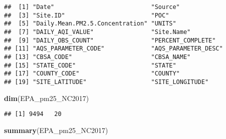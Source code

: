 \documentclass[]{article}
\newenvironment{Shaded}{\begin{snugshade}}{\end{snugshade}}
\newcommand{\KeywordTok}[1]{\textcolor[rgb]{0.13,0.29,0.53}{\textbf{#1}}}
\newcommand{\NormalTok}[1]{#1}
\begin{document}
\begin{verbatim}
##  [1] "Date"                           "Source"                        
##  [3] "Site.ID"                        "POC"                           
##  [5] "Daily.Mean.PM2.5.Concentration" "UNITS"                         
##  [7] "DAILY_AQI_VALUE"                "Site.Name"                     
##  [9] "DAILY_OBS_COUNT"                "PERCENT_COMPLETE"              
## [11] "AQS_PARAMETER_CODE"             "AQS_PARAMETER_DESC"            
## [13] "CBSA_CODE"                      "CBSA_NAME"                     
## [15] "STATE_CODE"                     "STATE"                         
## [17] "COUNTY_CODE"                    "COUNTY"                        
## [19] "SITE_LATITUDE"                  "SITE_LONGITUDE"
\end{verbatim}

\begin{Shaded}
\begin{Highlighting}[]
\KeywordTok{dim}\NormalTok{(EPA_pm25_NC2017)}
\end{Highlighting}
\end{Shaded}

\begin{verbatim}
## [1] 9494   20
\end{verbatim}

\begin{Shaded}
\begin{Highlighting}[]
\KeywordTok{summary}\NormalTok{(EPA_pm25_NC2017)}
\end{Highlighting}
\end{Shaded}
\end{document}
